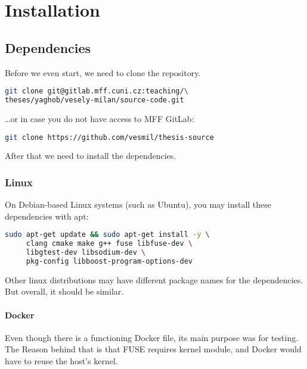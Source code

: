 \chapter{Installation}

\section*{Dependencies}\label{sec:dependencies}

Before we even start, we need to clone the repository.

\begin{lstlisting}[language=bash, basicstyle=\ttfamily\small]
git clone git@gitlab.mff.cuni.cz:teaching/\
theses/yaghob/vesely-milan/source-code.git
\end{lstlisting}

\noindent \ldots or in case you do not have access to MFF GitLab:

\begin{lstlisting}[language=bash, basicstyle=\ttfamily\small]
git clone https://github.com/vesmil/thesis-source
\end{lstlisting}

\noindent After that we need to install the dependencies.

\subsection*{Linux}

On Debian-based Linux systems (such as Ubuntu), you may install these dependencies with apt:

\begin{lstlisting}[language=bash, basicstyle=\ttfamily\small]
sudo apt-get update && sudo apt-get install -y \
     clang cmake make g++ fuse libfuse-dev \
     libgtest-dev libsodium-dev \
     pkg-config libboost-program-options-dev
\end{lstlisting}

\noindent Other linux distributions may have different package names for the dependencies.
But overall, it should be similar.

\subsubsection*{Docker}\label{subsubsec:docker-guide}

Even though there is a functioning Docker file, its main purpose was for testing.
The Reason behind that is that FUSE requires kernel module, and Docker would have to reuse the host's kernel.


